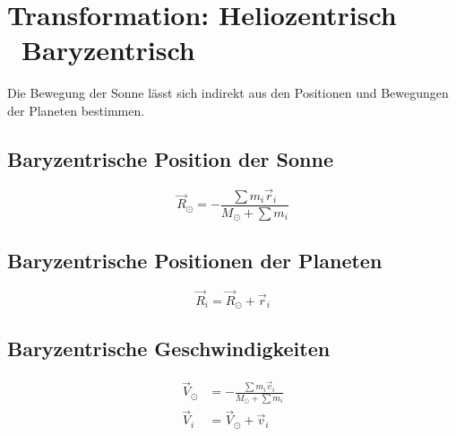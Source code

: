 \section{Transformation: Heliozentrisch \textrightarrow\ Baryzentrisch}
Die Bewegung der Sonne lässt sich indirekt aus den Positionen und Bewegungen der Planeten bestimmen.

\subsection*{Baryzentrische Position der Sonne}
\begin{equation}
\vec{R}_\odot = -\frac{\sum m_i \vec{r}_i}{M_\odot + \sum m_i}
\end{equation}

\subsection*{Baryzentrische Positionen der Planeten}
\begin{equation}
\vec{R}_i = \vec{R}_\odot + \vec{r}_i
\end{equation}

\subsection*{Baryzentrische Geschwindigkeiten}
\begin{align}
\vec{V}_\odot &= -\frac{\sum m_i \vec{v}_i}{M_\odot + \sum m_i} \\
\vec{V}_i &= \vec{V}_\odot + \vec{v}_i
\end{align}
